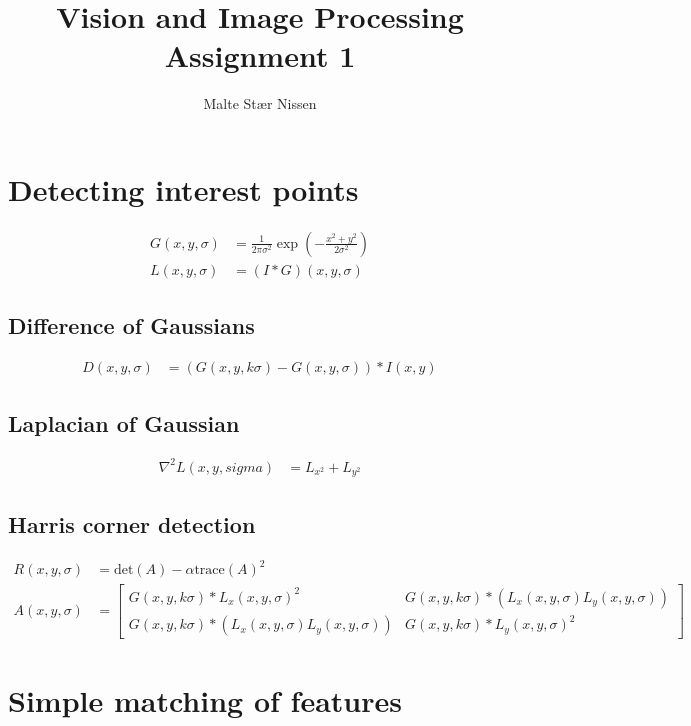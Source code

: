 \documentclass[11pt,a4paper]{article}
\title{Vision and Image Processing\\Assignment 1}
\author{Malte Stær Nissen}
\begin{document}
\maketitle

\section{Detecting interest points}
\begin{align}
    G(x,y,\sigma) &= \frac{1}{2\pi\sigma^2}\exp{\left( -\frac{x^2+y^2}{2\sigma^2}
    \right)} \\
    L(x,y,\sigma) &= \left( I \ast G \right)(x,y,\sigma)
\end{align}

\subsection{Difference of Gaussians}
\begin{align}
    D(x,y,\sigma) &= \left(G \left(x,y,k \sigma \right) - G \left( x,y,\sigma
    \right) \right) \ast I(x,y)
\end{align}

\subsection{Laplacian of Gaussian}
\begin{align}
    \nabla^2 L(x,y,sigma) &= L_{x^2}+L_{y^2}
\end{align}

\subsection{Harris corner detection}
\begin{align}
    R(x,y,\sigma) &= \text{det}\left( A \right) - \alpha \text{trace} \left( A
    \right) ^2 \\
    A(x,y,\sigma) &=
        \begin{bmatrix}
            G(x,y,k\sigma) \ast L_x(x,y,\sigma)^2 &
            G(x,y,k\sigma) \ast \left( L_x(x,y,\sigma) L_y(x,y,\sigma) \right) \\
            G(x,y,k\sigma) \ast \left( L_x(x,y,\sigma) L_y(x,y,\sigma) \right) &
            G(x,y,k\sigma) \ast L_y(x,y,\sigma)^2
        \end{bmatrix}
\end{align}

\section{Simple matching of features}
\end{document}

